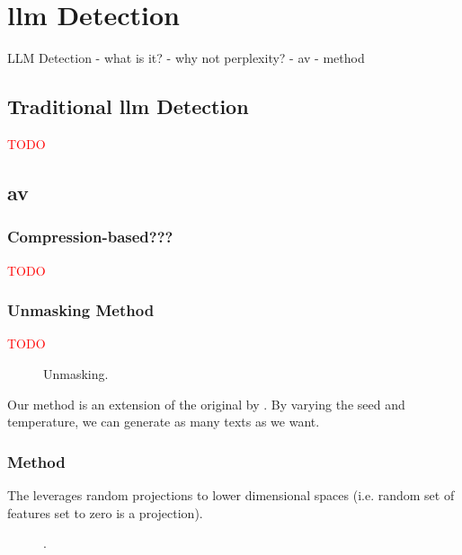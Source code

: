\chapter{\acs{llm} Detection}
\label{chap:llm_detection}
    LLM Detection
    - what is it?
    - why not perplexity?
    - av
    - \imp{} method

\section{Traditional \acs{llm} Detection}
\label{sec:llm_detection}
\textcolor{red}{TODO}






\section{\acl{av}}

\subsection{Compression-based???}
\textcolor{red}{TODO}


\subsection{Unmasking Method}
\textcolor{red}{TODO}


\begin{figure}[htbp]
    \centering
    
    \caption{Unmasking.}
    \label{fig:unmasking}
\end{figure}
Our method is an extension of the original \impAppr{} by \citet{koppel_determining_2014}.
By varying the seed and temperature, we can generate as many texts as we want.
  
\subsection{\imp{} Method}
\label{sec:impostor_method_theory}

The \impAppr{} leverages random projections to lower dimensional spaces (i.e. random set of features set to zero is a projection).
\begin{figure}[htbp]
    \centering
    
    \caption{\imp{}.}
    \label{fig:impostor}
\end{figure}


